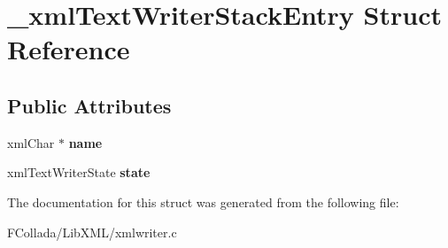 \hypertarget{struct__xmlTextWriterStackEntry}{
\section{\_\-xmlTextWriterStackEntry Struct Reference}
\label{struct__xmlTextWriterStackEntry}
}
\subsection*{Public Attributes}
\begin{DoxyCompactItemize}
\item 
\hypertarget{struct__xmlTextWriterStackEntry_a1848b8a01d8791132a08abf053800ea8}{
xmlChar $\ast$ {\bfseries name}}
\label{struct__xmlTextWriterStackEntry_a1848b8a01d8791132a08abf053800ea8}

\item 
\hypertarget{struct__xmlTextWriterStackEntry_a5faaf8d26483756738772070d69ae7e8}{
xmlTextWriterState {\bfseries state}}
\label{struct__xmlTextWriterStackEntry_a5faaf8d26483756738772070d69ae7e8}

\end{DoxyCompactItemize}


The documentation for this struct was generated from the following file:\begin{DoxyCompactItemize}
\item 
FCollada/LibXML/xmlwriter.c\end{DoxyCompactItemize}
